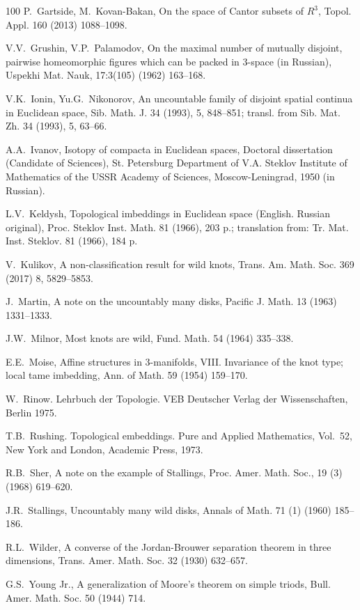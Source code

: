 \documentclass[12pt]{article}
\theoremstyle{definition}
\begin{document}
\begin{thebibliography}{100}
P.~Gartside, M.~Kovan-Bakan,
On the space of Cantor subsets of $R^3$,
Topol. Appl. 160 (2013) 1088--1098.

V.V.~Grushin, V.P.~Palamodov,
On the maximal number of mutually disjoint, pairwise homeomorphic figures which can be packed in 3-space  (in Russian),
Uspekhi Mat. Nauk, 17:3(105) (1962) 163--168.

V.K.~Ionin, Yu.G.~Nikonorov,
An uncountable family of disjoint spatial continua in Euclidean space,
Sib. Math. J. 34 (1993), 5, 848--851; transl. 
from Sib. Mat. Zh. 34 (1993), 5, 63--66.

A.A.~Ivanov,
Isotopy of compacta in Euclidean spaces,
Doctoral dissertation 
(Candidate of Sciences),
St. Petersburg Department of
V.A. Steklov Institute of Mathematics of
the USSR Academy of Sciences,
Moscow-Leningrad, 1950
(in Russian).

L.V.~Keldysh,
Topological imbeddings in Euclidean space (English. Russian original),
Proc. Steklov Inst. Math. 81 (1966), 203 p.; translation from: Tr. Mat. Inst. Steklov. 81  (1966), 184 p.

V.~Kulikov,
A non-classification result for wild
knots,
Trans. Am. Math. Soc. 369  (2017) 8, 5829--5853.

J.~Martin,
A note on the uncountably many disks,
Pacific J. Math. 13 (1963) 1331--1333.

J.W.~Milnor,
Most knots are wild,
Fund. Math. 54  (1964) 335--338.

E.E.~Moise,
Affine structures in $3$-manifolds, VIII. 
Invariance of the knot type;
local tame imbedding,
Ann. of Math. 59 (1954) 159--170.

W.~Rinow.
Lehrbuch der Topologie.
VEB Deutscher Verlag der Wissenschaften,
Berlin 1975.

T.B.~Rushing. Topological embeddings.
Pure and Applied Mathematics, Vol.~52,
New York and London, 
Academic Press, 1973.

R.B.~Sher,
A note on the example of Stallings,
Proc. Amer. Math. Soc., 19 (3) (1968) 619--620.


J.R.~Stallings, 
Uncountably many wild disks,
Annals of Math. 71 (1) (1960) 185--186.

R.L.~Wilder,
A converse of the Jordan-Brouwer separation
theorem in three dimensions,
Trans. Amer. Math. Soc. 32 (1930) 
632--657.

G.S.~Young Jr.,
A generalization of Moore's theorem on simple triods, 
Bull. Amer. Math. Soc. 50 (1944) 714.


\end{thebibliography}
\end{document}
